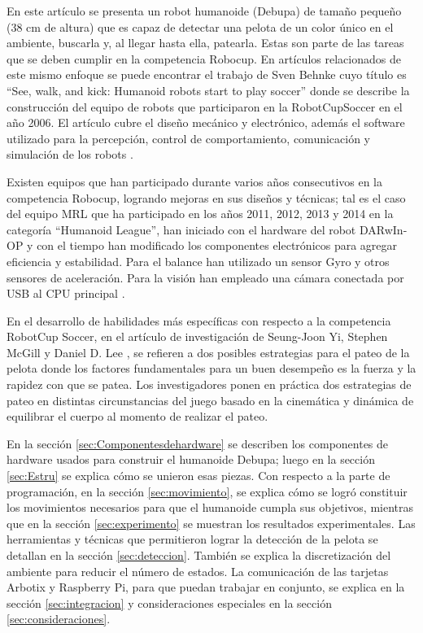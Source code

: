 \documentclass[tikz,conference, letterpaper]{IEEEtranMC1}
\begin{document}
En este artículo se presenta un robot humanoide (Debupa) de tamaño pequeño (38 cm de altura) que es capaz de detectar una pelota de un color único en el ambiente, buscarla y, al llegar hasta ella, patearla. Estas son parte de las tareas que se deben cumplir en la competencia Robocup. En artículos relacionados de este mismo enfoque se puede encontrar el trabajo de Sven Behnke cuyo título es “See, walk, and kick: Humanoid robots start to play soccer” donde se describe la construcción del equipo de robots que participaron en la RobotCupSoccer en el a\~no 2006. El artículo cubre el diseño mecánico y electrónico, además el software utilizado para la percepción, control de comportamiento, comunicación y simulación de los robots \cite{paper}. 

Existen equipos que han participado durante varios años consecutivos en la competencia Robocup, logrando mejoras en sus diseños y técnicas; tal es el caso del equipo MRL que ha participado en los años 2011, 2012, 2013 y 2014 en la categoría “Humanoid League”, han iniciado con el hardware del robot DARwIn-OP y con el tiempo han modificado los componentes electrónicos para agregar eficiencia y estabilidad. Para el balance han utilizado un sensor Gyro y otros sensores de aceleración. Para la visión han empleado una cámara conectada por USB al CPU principal \cite{paper1}. 

En el desarrollo de habilidades más específicas con respecto a la competencia RobotCup Soccer, en el artículo de investigación de Seung-Joon Yi, Stephen McGill y Daniel D. Lee  \cite{paper2}, se refieren a dos posibles estrategias para el pateo de la pelota donde los factores fundamentales para un buen desempeño es la fuerza y la rapidez con que se patea. Los investigadores ponen en pr\'actica dos estrategias de pateo en distintas circunstancias del juego basado en la cinemática y dinámica de equilibrar el cuerpo al momento de realizar el pateo.

En la secci\'on \ref{sec:Componentesdehardware} se describen los componentes de hardware usados para construir el humanoide Debupa; luego en la sección \ref{sec:Estru}
 se explica cómo se unieron esas piezas. Con respecto a la parte de programación, en la secci\'on \ref{sec:movimiento}, se explica c\'omo se logró constituir los movimientos necesarios para que el humanoide cumpla sus objetivos, mientras que en la secci\'on \ref{sec:experimento} se muestran los resultados experimentales. Las herramientas y técnicas  que  permitieron lograr  la detección de la pelota se detallan en la secci\'on \ref{sec:deteccion}. También se explica la discretización del ambiente para reducir el n\'umero de estados. La comunicación de las tarjetas Arbotix y Raspberry Pi, para que puedan trabajar en conjunto, se explica en la secci\'on \ref{sec:integracion}  y consideraciones especiales en la secci\'on \ref{sec:consideraciones}. 
\end{document}
